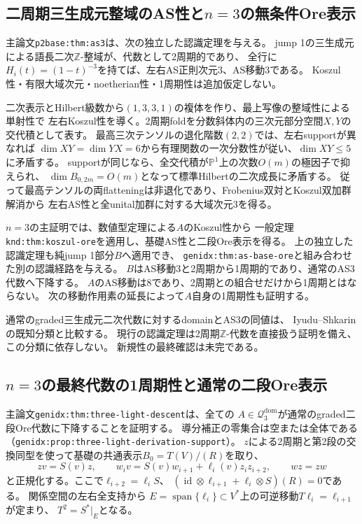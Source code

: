 \documentclass[11pt,a4paper]{ltjsarticle}
\begin{document}
\subsection{二周期三生成元整域のAS性と\texorpdfstring{$n=3$}{n=3}の無条件Ore表示}
主論文\texttt{p2base:thm:as3}は、次の独立した認識定理を与える。
jump 1の三生成元による語長二次$\mathbb Z$-整域が、代数として2周期的であり、
全行に$H_i(t)=(1-t)^{-3}$を持てば、左右AS正則次元3、AS移動3である。
Koszul性・有限大域次元・noetherian性・1周期性は追加仮定しない。

二次表示とHilbert級数から$(1,3,3,1)$の複体を作り、最上写像の整域性による単射性で
左右Koszul性を導く。2周期foldを分数斜体内の三次元部分空間$X,Y$の交代積として表す。
最高三次テンソルの退化階数$(2,2)$では、左右supportが異なれば
$\dim XY=\dim YX=6$から有理関数の一次分数性が従い、$\dim XY\leq5$に矛盾する。
supportが同じなら、全交代積が$\mathbb P^1$上の次数$O(m)$の極因子で抑えられ、
$\dim B_{0,2m}=O(m)$となって標準Hilbertの二次成長に矛盾する。
従って最高テンソルの両flatteningは非退化であり、Frobenius双対とKoszul双加群解消から
左右AS性と全unital加群に対する大域次元3を得る。

$n=3$の主証明では、数値型定理による$A$のKoszul性から
一般定理\texttt{knd:thm:koszul-ore}を適用し、基礎AS性と二段Ore表示を得る。
上の独立した認識定理も純jump 1部分$B$へ適用でき、
\texttt{genidx:thm:as-base-ore}と組み合わせた別の認識経路を与える。
$B$はAS移動3と2周期から1周期的であり、通常のAS3代数へ下降する。
$A$のAS移動は8であり、2周期との組合せだけから1周期とはならない。
次の移動作用素の延長によって$A$自身の1周期性も証明する。

通常のgraded三生成元二次代数に対するdomainとAS3の同値は、
Iyudu--Shkarinの既知分類と比較する。
現行の認識定理は2周期$\mathbb Z$-代数を直接扱う証明を備え、この分類に依存しない。
新規性の最終確認は未完である。

\subsection{\texorpdfstring{$n=3$}{n=3}の最終代数の1周期性と通常の二段Ore表示}
主論文\texttt{genidx:thm:three-light-descent}は、全ての
$A\in\mathcal Q_3^{\mathrm{dom}}$が通常のgraded二段Ore代数に下降することを証明する。
導分補正の零集合は空または全体である
（\texttt{genidx:prop:three-light-derivation-support}）。
$z$による2周期と第2段の交換同型を使って基礎の共通表示$B_0=T(V)/(R)$を取り、
\[
zv=S(v)z,\qquad
w_i v=S(v)w_{i+1}+\ell_i(v)z_i z_{i+2},\qquad wz=zw
\]
と正規化する。ここで$\ell_{i+2}=\ell_iS$、
$(\operatorname{id}\otimes\ell_{i+1}+\ell_i\otimes S)(R)=0$である。
関係空間の左右全支持から
$E=\operatorname{span}\{\ell_i\}\subset V^*$上の可逆移動$T\ell_i=\ell_{i+1}$が定まり、
$T^2=S^*|_E$となる。
\end{document}
